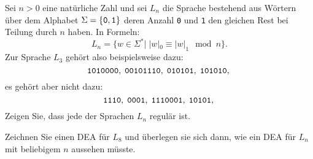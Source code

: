 Sei $n>0$ eine natürliche Zahl und sei $L_n$ die Sprache bestehend
aus Wörtern über dem Alphabet
$\Sigma=\{{\tt 0},{\tt 1 }\}$ deren Anzahl {\tt 0} und {\tt 1}
den gleichen Rest bei Teilung durch $n$ haben. In Formeln:
\[
L_n=\{ w\in\Sigma^*| \; |w|_0\equiv |w|_1\mod n\}.
\]
Zur Sprache $L_3$ gehört also beispielsweise dazu:
\[
\text{\tt 1010000},\;
\text{\tt 00101110},\;
\text{\tt 010101},\;
\text{\tt 101010},\;
\]
es gehört aber nicht dazu:
\[
\text{\tt 1110},\;
\text{\tt 0001},\;
\text{\tt 1110001},\;
\text{\tt 10101},\;
\]
Zeigen Sie, dass jede der Sprachen $L_n$ regulär ist.

\begin{hinweis}
Zeichnen Sie einen DEA für $L_8$ und überlegen sie
sich dann, wie ein DEA für $L_n$ mit beliebigem $n$ aussehen müsste.
\end{hinweis}


